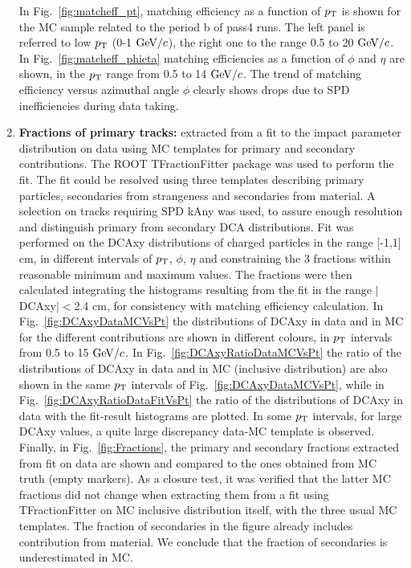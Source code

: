 \begin{enumerate}
In Fig.~\ref{fig:matcheff_pt}, matching efficiency as a function of 
$p_{\rm T}$ is shown for the MC sample related to the period b of pass4 runs.  
The left panel  is referred to low $p_{\rm T}$ (0-1 $\mathrm{GeV}/c$), the right one
 to the range 0.5 to 20 $\mathrm{GeV}/c$. 
In Fig.~\ref{fig:matcheff_phieta} matching efficiencies as a function of 
$\phi$ and $\eta$ are shown, in the $p_{\rm T}$ range from 0.5 to 14 $\mathrm{GeV}/c$.
 The trend of matching efficiency versus azimuthal angle $\phi$ clearly 
shows drops due to SPD inefficiencies during data taking.
\item {\bf Fractions of primary tracks:} extracted from a fit to
 the impact parameter distribution on data using MC templates for 
 primary and secondary contributions. The ROOT TFractionFitter 
 package was used to perform the fit. The fit could be resolved 
 using three templates describing primary particles, secondaries 
 from strangeness and secondaries from material. A selection on 
 tracks requiring SPD kAny was used, to assure enough resolution
  and distinguish primary from secondary DCA distributions.
Fit was performed on the DCAxy distributions of charged particles 
in the range [-1,1] cm, in different intervals of $p_{\rm T}$, $\phi$, $\eta$ 
and constraining the 3 fractions within reasonable minimum and maximum values.
The fractions were then calculated integrating the histograms 
resulting from the fit in the range $|$DCAxy$|<$2.4 cm, for
consistency with matching efficiency calculation. In Fig.~\ref{fig:DCAxyDataMCVsPt}
 the distributions of DCAxy in data and in MC for the different contributions are
shown in different colours, in $p_{\rm T}$ intervals from 0.5 to 15 $\mathrm{GeV}/c$.
 In Fig.~\ref{fig:DCAxyRatioDataMCVsPt} the ratio of the distributions 
 of DCAxy in data and in MC (inclusive distribution) are also
shown in the same $p_{\rm T}$ intervals of Fig.~\ref{fig:DCAxyDataMCVsPt}, 
while in Fig.~\ref{fig:DCAxyRatioDataFitVsPt} the ratio of the 
distributions of DCAxy in data with the fit-result histograms are plotted. 
In some $p_{\rm T}$ intervals, for large DCAxy values, a quite large 
discrepancy data-MC template is observed.
Finally, in Fig.~\ref{fig:Fractions}, the primary and secondary
 fractions extracted from fit on data are shown and compared to 
 the ones obtained from MC truth (empty markers). As a closure test, 
 it was verified that the latter MC fractions did not change when extracting
them from a fit using TFractionFitter on MC inclusive distribution itself, 
with the three usual MC templates.  
The fraction of secondaries in the figure already includes contribution 
from material. We conclude that the fraction of secondaries is underestimated in MC.

\end{enumerate}
